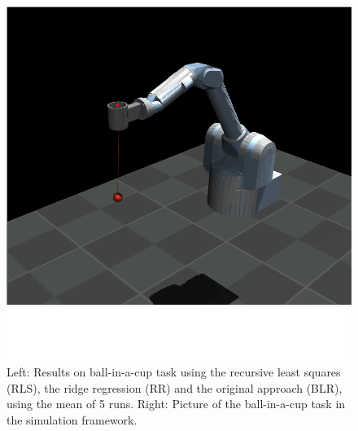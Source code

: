 \begin{figure}
  \centering
    \begin{minipage}{0.45\textwidth}
      \centering
      
      \hspace{1cm}
    \end{minipage}\hfill
    \begin{minipage}{0.45\textwidth}
      \centering
      \includegraphics[scale=0.7]{figures/ball_in_a_cup_hack.png}
      \hspace{1cm}
    \end{minipage}
     \caption{\small
       {\color{gray!25!black!60} Left:}
       Results on ball-in-a-cup task
       using the recursive least squares (RLS),
       the ridge regression (RR)
       and the original approach (BLR), using the mean of 5 runs.
       {\color{gray!25!black!60} Right:}
       Picture of the ball-in-a-cup task in the simulation framework.
     }
     \label{fig:cup}
\end{figure}

%
%
%
